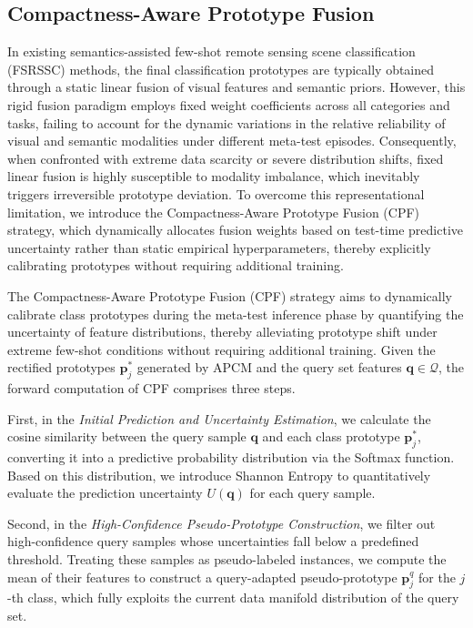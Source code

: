 \documentclass[lettersize,journal]{IEEEtran}
\begin{document}
\subsection{Compactness-Aware Prototype Fusion}
\label{sec:cpf}

In existing semantics-assisted few-shot remote sensing scene classification (FSRSSC) methods, the final classification prototypes are typically obtained through a static linear fusion of visual features and semantic priors. 
However, this rigid fusion paradigm employs fixed weight coefficients across all categories and tasks, failing to account for the dynamic variations in the relative reliability of visual and semantic modalities under different meta-test episodes. 
Consequently, when confronted with extreme data scarcity or severe distribution shifts, fixed linear fusion is highly susceptible to modality imbalance, which inevitably triggers irreversible prototype deviation.
To overcome this representational limitation, we introduce the Compactness-Aware Prototype Fusion (CPF) strategy, which dynamically allocates fusion weights based on test-time predictive uncertainty rather than static empirical hyperparameters, thereby explicitly calibrating prototypes without requiring additional training.

The Compactness-Aware Prototype Fusion (CPF) strategy aims to dynamically calibrate class prototypes during the meta-test inference phase by quantifying the uncertainty of feature distributions, thereby alleviating prototype shift under extreme few-shot conditions without requiring additional training. 
Given the rectified prototypes $\mathbf{p}^*_j$ generated by APCM and the query set features $\mathbf{q} \in \mathcal{Q}$, the forward computation of CPF comprises three steps. 

First, in the \textit{Initial Prediction and Uncertainty Estimation}, we calculate the cosine similarity between the query sample $\mathbf{q}$ and each class prototype $\mathbf{p}^*_j$, converting it into a predictive probability distribution via the Softmax function. 
Based on this distribution, we introduce Shannon Entropy to quantitatively evaluate the prediction uncertainty $U(\mathbf{q})$ for each query sample. 

Second, in the \textit{High-Confidence Pseudo-Prototype Construction}, we filter out high-confidence query samples whose uncertainties fall below a predefined threshold. 
Treating these samples as pseudo-labeled instances, we compute the mean of their features to construct a query-adapted pseudo-prototype $\mathbf{p}^q_j$ for the $j$-th class, which fully exploits the current data manifold distribution of the query set. 
\end{document}
